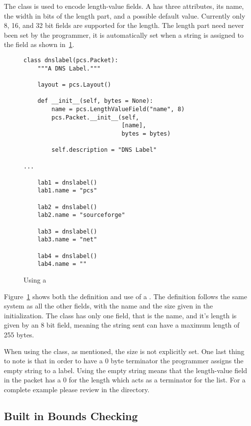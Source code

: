 \documentclass[11pt]{article}
\begin{document}
The  class is used to encode length-value
fields.  A  has three attributes, its name,
the width in bits of the length part, and a possible default value.
Currently only 8, 16, and 32 bit fields are supported for the length.
The length part need never been set by the programmer, it is
automatically set when a string is assigned to the field as shown
in~\ref{fig:using-a-length-value-field}.

\begin{figure}
  \centering
\begin{lstlisting}
class dnslabel(pcs.Packet):
    """A DNS Label.""" 

    layout = pcs.Layout()

    def __init__(self, bytes = None):
        name = pcs.LengthValueField("name", 8)
        pcs.Packet.__init__(self,
                            [name],
                            bytes = bytes)
        
        self.description = "DNS Label"

...

    lab1 = dnslabel()
    lab1.name = "pcs"

    lab2 = dnslabel()
    lab2.name = "sourceforge"

    lab3 = dnslabel()
    lab3.name = "net"

    lab4 = dnslabel()
    lab4.name = ""
\end{lstlisting}
  \caption{Using a }
  \label{fig:using-a-length-value-field}
\end{figure}

Figure~\ref{fig:using-a-length-value-field} shows both the definition
and use of a .  The definition follows the
same system as all the other fields, with the name and the size given
in the initialization.  The  class has only one field,
that is the name, and it's length is given by an 8 bit field, meaning
the string sent can have a maximum length of 255 bytes.  

When using the class, as mentioned, the size is not explicitly set.
One last thing to note is that in order to have a 0 byte terminator
the programmer assigns the empty string to a label.  Using the empty
string means that the length-value field in the packet has a 0 for the
length which acts as a terminator for the list.  For a complete
example please review  in the 
directory.

\subsection{Built in Bounds Checking}
\label{sec:built-in-bounds-checking}
\end{document}
